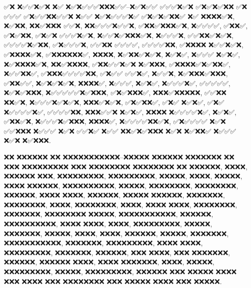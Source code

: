 \enabledirectives[backend.pdf.nounicode=noai]
\enabledirectives[backend.pdf.nounicode=nopilot]
\enabledirectives[backend.pdf.nounicode=justread]
\enabledirectives[backend.pdf.nounicode=🇺🇦] %
\enabledirectives[backend.pdf.nounicode=✅]
\enabledirectives[backend.pdf.nounicode=✅❌]
\enabledirectives[backend.pdf.nounicode=❌]

\startTEXpage[offset=1ts]
    
\stopTEXpage


✅❌ ❌✅✅❌✅❌ ❌✅ ❌✅❌✅✅✅❌❌❌✅✅--❌✅❌✅✅ ✅✅✅❌✅❌ ✅❌✅❌✅❌❌ ✅❌ ✅✅✅ ✅❌✅✅❌❌✅✅❌ ❌✅✅ ❌✅❌✅✅✅❌✅
✅❌✅❌✅❌❌✅ ❌✅ ❌❌❌❌✅❌, ❌✅❌❌, ❌❌✅❌❌❌ ✅✅❌, ❌❌✅✅✅❌✅✅❌, ✅❌❌✅❌❌❌✅❌, ❌✅✅✅✅, ✅❌❌✅, ✅❌✅❌❌, ✅❌✅❌
✅✅✅❌✅❌, ❌✅✅❌✅❌❌❌✅❌, ❌✅✅✅❌, ✅✅❌❌✅❌✅❌, ✅✅✅✅❌✅❌❌, ✅❌✅✅✅❌, ✅✅❌❌ ✅✅✅✅, ✅✅✅✅❌❌, ✅❌❌❌❌
❌✅✅❌✅❌, ✅❌❌❌❌✅❌, ✅❌❌❌❌❌❌✅, ❌❌❌❌, ❌✅❌❌✅❌✅❌, ❌✅❌✅, ❌✅✅✅ ❌✅❌✅, ❌✅❌❌❌❌✅❌, ❌❌✅❌❌❌❌, ✅❌❌✅✅❌✅❌
❌✅❌❌❌, ✅❌❌❌❌✅❌✅❌❌✅, ❌✅✅❌❌✅, ✅❌❌❌✅✅✅✅❌❌, ✅❌✅✅ ✅✅❌✅, ❌✅✅❌, ❌✅❌❌❌✅❌❌❌, ✅❌❌✅✅, ❌✅❌✅❌✅❌,
❌❌❌❌✅, ❌✅✅✅, ❌✅❌✅, ❌✅✅✅❌✅, ✅✅✅✅✅, ❌✅❌✅❌❌❌, ❌✅✅✅✅✅❌✅❌❌❌, ✅❌✅❌❌❌✅, ❌❌❌✅❌❌❌❌❌, ✅✅❌❌
❌❌✅❌, ❌✅✅✅❌✅❌✅❌, ❌❌❌✅❌✅❌, ✅❌✅❌❌✅, ✅❌✅ ❌✅❌✅, ✅❌✅ ❌✅✅✅✅❌✅, ✅✅✅✅❌❌, ❌❌❌✅✅❌ ❌✅❌✅, ❌❌❌❌
❌✅✅✅✅❌✅, ❌✅❌✅, ✅❌❌✅❌, ❌✅✅✅❌✅❌❌❌, ❌❌❌❌✅, ❌✅✅✅✅❌❌✅❌, ✅❌✅✅✅✅ ❌✅❌ ✅✅❌❌❌ ❌✅✅✅ ❌✅❌
✅✅❌✅ ❌✅✅ ❌❌✅❌✅❌❌❌ ❌✅❌ ❌✅❌❌✅ ❌✅✅✅ ❌✅❌ ❌✅❌❌❌.

❌❌ ❌❌❌❌❌❌ ❌❌ ❌❌❌❌❌❌❌❌❌❌❌--❌❌❌❌❌ ❌❌❌❌❌❌ ❌❌❌❌❌❌❌ ❌❌ ❌❌❌ ❌❌❌❌❌❌❌❌❌ ❌❌❌ ❌❌❌❌❌❌❌❌
❌❌❌❌❌❌❌❌ ❌❌ ❌❌❌❌❌❌, ❌❌❌❌, ❌❌❌❌❌❌ ❌❌❌, ❌❌❌❌❌❌❌❌❌, ❌❌❌❌❌❌❌❌❌, ❌❌❌❌❌, ❌❌❌❌, ❌❌❌❌❌, ❌❌❌❌
❌❌❌❌❌❌, ❌❌❌❌❌❌❌❌❌❌, ❌❌❌❌❌, ❌❌❌❌❌❌❌❌, ❌❌❌❌❌❌❌❌, ❌❌❌❌❌❌, ❌❌❌❌ ❌❌❌❌, ❌❌❌❌❌❌, ❌❌❌❌❌
❌❌❌❌❌❌, ❌❌❌❌❌❌❌, ❌❌❌❌❌❌❌❌, ❌❌❌❌, ❌❌❌❌❌❌❌❌, ❌❌❌❌, ❌❌❌❌ ❌❌❌❌, ❌❌❌❌❌❌❌❌, ❌❌❌❌❌❌❌, ❌❌❌❌❌❌❌❌
❌❌❌❌❌, ❌❌❌❌❌❌❌❌❌❌❌, ❌❌❌❌❌❌, ❌❌❌❌❌❌❌❌❌❌, ❌❌❌❌ ❌❌❌❌, ❌❌❌❌, ❌❌❌❌❌❌❌❌❌, ❌❌❌❌❌, ❌❌❌❌❌❌❌,
❌❌❌❌❌, ❌❌❌❌, ❌❌❌❌, ❌❌❌❌❌❌, ❌❌❌❌❌, ❌❌❌❌❌❌❌, ❌❌❌❌❌❌❌❌❌❌❌, ❌❌❌❌❌❌❌, ❌❌❌❌❌❌❌❌❌, ❌❌❌❌
❌❌❌❌, ❌❌❌❌❌❌❌❌❌, ❌❌❌❌❌❌❌, ❌❌❌❌❌❌, ❌❌❌ ❌❌❌❌, ❌❌❌ ❌❌❌❌❌❌❌, ❌❌❌❌❌❌, ❌❌❌❌❌❌ ❌❌❌❌, ❌❌❌❌
❌❌❌❌❌❌❌, ❌❌❌❌, ❌❌❌❌❌, ❌❌❌❌❌❌❌❌❌, ❌❌❌❌❌, ❌❌❌❌❌❌❌❌❌, ❌❌❌❌❌❌ ❌❌❌ ❌❌❌❌❌ ❌❌❌❌ ❌❌❌
❌❌❌❌ ❌❌❌ ❌❌❌❌❌❌❌❌ ❌❌❌ ❌❌❌❌❌ ❌❌❌❌ ❌❌❌ ❌❌❌❌❌.

